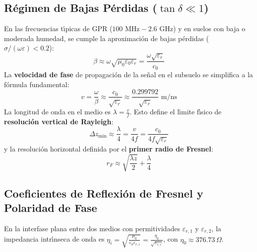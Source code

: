 \documentclass[11pt,a4paper]{article}
\begin{document}
\subsection{R{\'e}gimen de Bajas P{\'e}rdidas \texorpdfstring{($\tan\delta \ll 1$)}{(tan delta << 1)}}
En las frecuencias t{\'\i}picas de GPR ($100\text{ MHz} - 2.6\text{ GHz}$) y en suelos con baja o moderada humedad, se cumple la aproximaci{\'o}n de bajas p{\'e}rdidas ($\sigma / (\omega\varepsilon) < 0.2$):
\begin{equation}
    \beta \approx \omega \sqrt{\mu_0 \varepsilon_0 \varepsilon_r} = \frac{\omega \sqrt{\varepsilon_r}}{c_0}
\end{equation}
La \textbf{velocidad de fase} de propagaci{\'o}n de la se{\~n}al en el subsuelo se simplifica a la f{\'o}rmula fundamental:
\begin{equation}
    v = \frac{\omega}{\beta} \approx \frac{c_0}{\sqrt{\varepsilon_r}} \approx \frac{0.299792}{\sqrt{\varepsilon_r}} \text{ m/ns}
\end{equation}
La longitud de onda en el medio es $\lambda = \frac{v}{f}$. Esto define el l{\'\i}mite f{\'\i}sico de \textbf{resoluci{\'o}n vertical de Rayleigh}:
\begin{equation}
    \Delta z_{\min} \approx \frac{\lambda}{4} = \frac{v}{4 f} = \frac{c_0}{4 f \sqrt{\varepsilon_r}}
\end{equation}
y la resoluci{\'o}n horizontal definida por el \textbf{primer radio de Fresnel}:
\begin{equation}
    r_F \approx \sqrt{\frac{\lambda z}{2}} + \frac{\lambda}{4}
\end{equation}

\subsection{Coeficientes de Reflexi{\'o}n de Fresnel y Polaridad de Fase}
En la interfase plana entre dos medios con permitividades $\varepsilon_{r,1}$ y $\varepsilon_{r,2}$, la impedancia intr{\'\i}nseca de onda es $\eta_i = \sqrt{\frac{\mu_0}{\varepsilon_0 \varepsilon_{r,i}}} = \frac{\eta_0}{\sqrt{\varepsilon_{r,i}}}$, con $\eta_0 \approx 376.73\,\Omega$.
\end{document}
